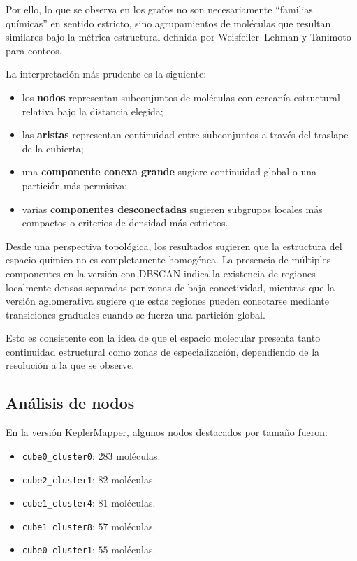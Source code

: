 \documentclass[12pt]{article}
\begin{document}
Por ello, lo que se observa en los grafos no son necesariamente ``familias qu\'imicas'' en sentido estricto, sino agrupamientos de mol\'eculas que resultan similares bajo la m\'etrica estructural definida por Weisfeiler--Lehman y Tanimoto para conteos.

La interpretaci\'on m\'as prudente es la siguiente:
\begin{itemize}
    \item los \textbf{nodos} representan subconjuntos de mol\'eculas con cercan\'ia estructural relativa bajo la distancia elegida;
    \item las \textbf{aristas} representan continuidad entre subconjuntos a trav\'es del traslape de la cubierta;
    \item una \textbf{componente conexa grande} sugiere continuidad global o una partici\'on m\'as permisiva;
    \item varias \textbf{componentes desconectadas} sugieren subgrupos locales m\'as compactos o criterios de densidad m\'as estrictos.
\end{itemize}

Desde una perspectiva topológica, los resultados sugieren que la estructura del espacio químico no es completamente homogénea. La presencia de múltiples componentes en la versión con DBSCAN indica la existencia de regiones localmente densas separadas por zonas de baja conectividad, mientras que la versión aglomerativa sugiere que estas regiones pueden conectarse mediante transiciones graduales cuando se fuerza una partición global.

Esto es consistente con la idea de que el espacio molecular presenta tanto continuidad estructural como zonas de especialización, dependiendo de la resolución a la que se observe.

\subsection{An\'alisis de nodos}

En la versi\'on KeplerMapper, algunos nodos destacados por tama\~no fueron:

\begin{itemize}
    \item \texttt{cube0\_cluster0}: $283$ mol\'eculas.
    \item \texttt{cube2\_cluster1}: $82$ mol\'eculas.
    \item \texttt{cube1\_cluster4}: $81$ mol\'eculas.
    \item \texttt{cube1\_cluster8}: $57$ mol\'eculas.
    \item \texttt{cube0\_cluster1}: $55$ mol\'eculas.
\end{itemize}
\end{document}
